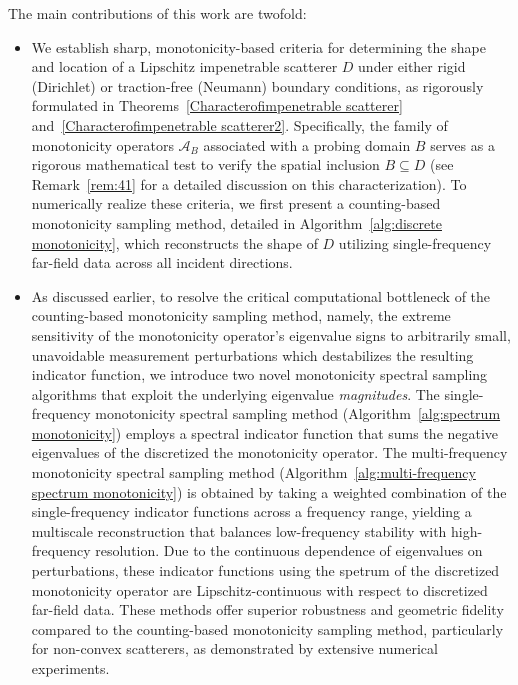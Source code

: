 \documentclass[11pt,reqno,twoside]{amsart}
\theoremstyle{definition}
\theoremstyle{remark}
\numberwithin{equation}{section}
\begin{document}
The main contributions of this work are twofold:
\begin{itemize}
    \item[(1)] 
  We establish sharp, monotonicity-based criteria for determining the shape and location of a Lipschitz impenetrable scatterer $D$ under either rigid (Dirichlet) or traction-free (Neumann) boundary conditions, as rigorously formulated in Theorems~\ref{Characterofimpenetrable scatterer} and~\ref{Characterofimpenetrable scatterer2}. Specifically, the family of monotonicity operators $\mathcal{A}_B$ associated with a probing domain $B$ serves as a rigorous mathematical test to verify the spatial inclusion $B \subseteq D$ (see Remark~\ref{rem:41} for a detailed discussion on this characterization).  To numerically realize these criteria, we first present a counting-based monotonicity sampling method, detailed in Algorithm~\ref{alg:discrete monotonicity}, which reconstructs the shape of $D$ utilizing single-frequency far-field data across all incident directions.

    \item[(2)] 
As discussed earlier, to resolve the critical computational bottleneck of the counting-based monotonicity sampling method, namely, the extreme sensitivity of the monotonicity operator's eigenvalue signs to arbitrarily small, unavoidable measurement perturbations which destabilizes the resulting indicator function, we introduce two novel monotonicity spectral sampling algorithms that  exploit the underlying eigenvalue \emph{magnitudes}. The single-frequency monotonicity spectral sampling method (Algorithm~\ref{alg:spectrum monotonicity}) employs a spectral indicator function that sums the negative eigenvalues of the discretized  the monotonicity operator. The multi-frequency monotonicity spectral sampling method (Algorithm~\ref{alg:multi-frequency spectrum monotonicity})  is obtained by taking a weighted combination of the single-frequency indicator functions across a frequency range, yielding a multiscale reconstruction that balances low-frequency stability with high-frequency resolution. Due to the continuous dependence of eigenvalues on perturbations, these indicator functions using the spetrum of the discretized  monotonicity operator are Lipschitz-continuous with respect to discretized  far-field data. These methods offer superior robustness and geometric fidelity compared to the counting-based monotonicity sampling method, particularly for non-convex scatterers, as demonstrated by extensive numerical experiments.
\end{itemize}
\end{document}
